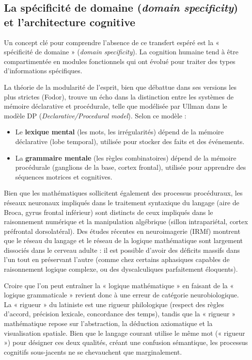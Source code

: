 \subsection{La spécificité de domaine (\textit{domain specificity}) et l'architecture cognitive}

Un concept clé pour comprendre l'absence de ce transfert espéré est la « spécificité de domaine »
(\textit{domain specificity}).\cite{II-1-2-ref23} La cognition humaine tend à être compartimentée en
modules fonctionnels qui ont évolué pour traiter des types d'informations spécifiques.

La théorie de la modularité de l'esprit, bien que débattue dans ses versions les plus strictes
(Fodor), trouve un écho dans la distinction entre les systèmes de mémoire déclarative et
procédurale, telle que modélisée par Ullman dans le modèle DP (\textit{Declarative/Procedural
model}).\cite{II-1-2-ref25} Selon ce modèle :

\begin{itemize}\item Le \textbf{lexique mental} (les mots, les irrégularités) dépend de la mémoire déclarative (lobe temporal), utilisée pour stocker des faits et des événements.\item La \textbf{grammaire mentale} (les règles combinatoires) dépend de la mémoire procédurale (ganglions de la base, cortex frontal), utilisée pour apprendre des séquences motrices et cognitives.\cite{II-1-2-ref25}\end{itemize}Bien que les mathématiques sollicitent également des processus procéduraux, les réseaux neuronaux
impliqués dans le traitement syntaxique du langage (aire de Broca, gyrus frontal inférieur) sont
distincts de ceux impliqués dans le raisonnement numérique et la manipulation algébrique (sillon
intrapariétal, cortex préfrontal dorsolatéral).\cite{II-1-2-ref28} Des études récentes en
neuroimagerie (IRMf) montrent que le réseau du langage et le réseau de la logique mathématique sont
largement dissociés dans le cerveau adulte : il est possible d'avoir des déficits massifs dans l'un
tout en préservant l'autre (comme chez certains aphasiques capables de raisonnement logique
complexe, ou des dyscalculiques parfaitement éloquents).\cite{II-1-2-ref28}

Croire que l'on peut entraîner la « logique mathématique » en faisant de la « logique grammaticale »
revient donc à une erreur de catégorie neurobiologique. La « rigueur » du latiniste est une rigueur
philologique (respect des règles d'accord, précision lexicale, concordance des temps), tandis que la
« rigueur » mathématique repose sur l'abstraction, la déduction axiomatique et la visualisation
spatiale.\cite{II-1-2-ref29} Bien que le langage courant utilise le même mot (« rigueur ») pour
désigner ces deux qualités, créant une confusion sémantique, les processus cognitifs sous-jacents ne
se chevauchent que marginalement.\cite{II-1-2-ref31}

